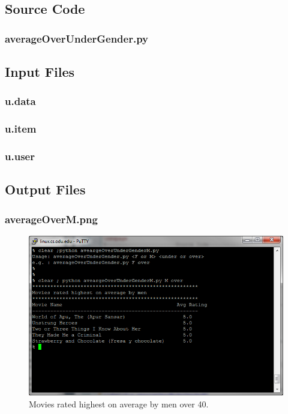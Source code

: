 \documentclass[12pt]{article}
\begin{document}
\newpage
\subsection{Source Code}
\subsubsection{averageOverUnderGender.py}

\newpage

\subsection{Input Files}
\subsubsection{u.data}

\subsubsection{u.item}

\subsubsection{u.user}

\newpage

\subsection{Output Files}
\subsubsection{averageOverM.png}
\begin{figure}[ht]
\includegraphics[scale=1.0]{../Q9/averageOverM}
\centering
\caption{Movies rated highest on average by men over 40.}
\label{fig:averageOverM}
\end{figure}
\newpage
\end{document}
